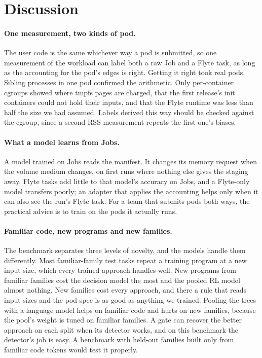 \section{Discussion}
\label{sec:discussion}

\paragraph{One measurement, two kinds of pod.}
The user code is the same whichever way a pod is submitted, so one measurement of the workload can label both a
raw Job and a Flyte task, as long as the accounting for the pod's edges is right. Getting it right took real pods.
Sibling processes in one pod confirmed the arithmetic. Only per-container cgroups showed where tmpfs pages are
charged, that the first release's init containers could not hold their inputs, and that the Flyte runtime was less
than half the size we had assumed. Labels derived this way should be checked against the cgroup, since a second RSS
measurement repeats the first one's biases.

\paragraph{What a model learns from Jobs.}
A model trained on Jobs reads the manifest. It changes its memory request when the volume medium changes, on first
runs where nothing else gives the staging away. Flyte tasks add little to that model's accuracy on Jobs, and a
Flyte-only model transfers poorly; an adapter that applies the accounting helps only when it can also see the run's
Flyte task. For a team that submits pods both ways, the practical advice is to train on the pods it actually runs.

\paragraph{Familiar code, new programs and new families.}
The benchmark separates three levels of novelty, and the models handle them differently. Most familiar-family test
tasks repeat a training program at a new input size, which every trained approach handles well. New programs from
familiar families cost the decision model the most and the pooled RL model almost nothing. New families cost every
approach, and there a rule that reads input sizes and the pod spec is as good as anything we trained. Pooling the
trees with a language model helps on familiar code and hurts on new families, because the pool's weight is tuned
on familiar families. A gate can recover the better approach on each split when its detector works, and on this
benchmark the detector's job is easy. A benchmark with held-out families built only from familiar code tokens
would test it properly.

